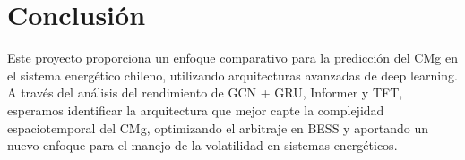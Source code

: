 \documentclass[twocolumn]{article}
\begin{document}
\section{Conclusión}
Este proyecto proporciona un enfoque comparativo para la predicción del CMg en el sistema energético chileno, utilizando arquitecturas avanzadas de deep learning. A través del análisis del rendimiento de GCN + GRU, Informer y TFT, esperamos identificar la arquitectura que mejor capte la complejidad espaciotemporal del CMg, optimizando el arbitraje en BESS y aportando un nuevo enfoque para el manejo de la volatilidad en sistemas energéticos.





\end{document}
